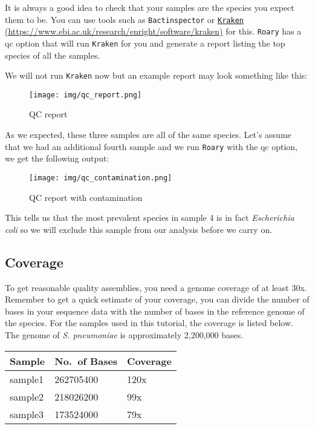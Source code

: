 \documentclass[11pt]{article}
\begin{document}
It is always a good idea to check that your samples are the species you
expect them to be. You can use tools such as \texttt{Bactinspector} or
\href{https://www.ebi.ac.uk/research/enright/software/kraken}{\texttt{Kraken}
(https://www.ebi.ac.uk/research/enright/software/kraken)} for this.
\texttt{Roary} has a qc option that will run \texttt{Kraken} for you and
generate a report listing the top species of all the samples.

We will not run \texttt{Kraken} now but an example report may look
something like this:

    \begin{figure}
\centering
\texttt{[image: img/qc\_report.png]}
\caption{QC report}
\end{figure}

    As we expected, these three samples are all of the same species. Let's
assume that we had an additional fourth sample and we run \texttt{Roary}
with the qc option, we get the following output:

    \begin{figure}
\centering
\texttt{[image: img/qc\_contamination.png]}
\caption{QC report with contamination}
\end{figure}

    This tells us that the most prevalent species in sample 4 is in fact
\textit{Escherichia coli} so we will exclude this sample from our analysis
before we carry on.

\hypertarget{coverage}{%
\subsection{Coverage}\label{coverage}}

To get reasonable quality assemblies, you need a genome coverage of at
least 30x. Remember to get a quick estimate of your coverage, you can
divide the number of bases in your sequence data with the number of
bases in the reference genome of the species. For the samples used in
this tutorial, the coverage is listed below. The genome of \textit{S.
pneumoniae} is approximately 2,200,000 bases.

\begin{longtable}[]{@{}lll@{}}
\toprule
Sample & No.~of Bases & Coverage \\
\midrule
\endhead
sample1 & 262705400 & 120x \\
sample2 & 218026200 & 99x \\
sample3 & 173524000 & 79x \\
\bottomrule
\end{longtable}
\end{document}
